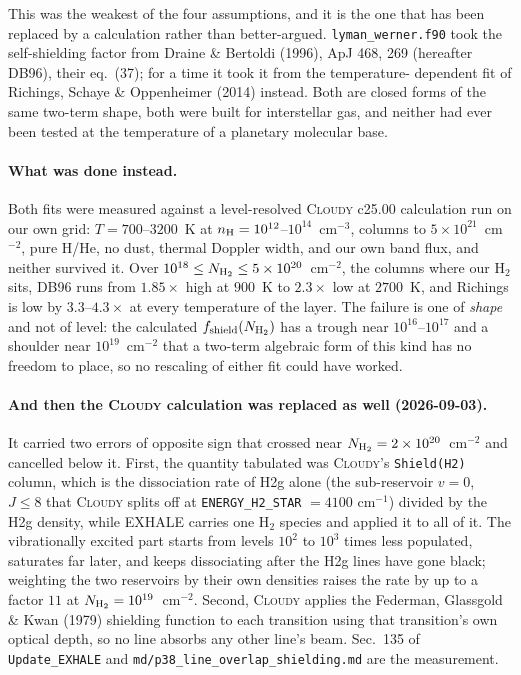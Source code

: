 \documentclass[english,a4paper]{my_memo}
\begin{document}
This was the weakest of the four assumptions, and it is the one that has been
replaced by a calculation rather than better-argued. \texttt{lyman\_werner.f90}
took the self-shielding factor from Draine \& Bertoldi (1996), ApJ 468, 269
(hereafter DB96), their eq.~(37); for a time it took it from the temperature-%
dependent fit of Richings, Schaye \& Oppenheimer (2014) instead. Both are
closed forms of the same two-term shape, both were built for interstellar gas,
and neither had ever been tested at the temperature of a planetary molecular
base.

\paragraph{What was done instead.} Both fits were measured against a
level-resolved \textsc{Cloudy} c25.00 calculation run on our own grid:
$T = 700$--$3200$~K at $n_{\rm H} = 10^{12}$--$10^{14}$~cm$^{-3}$, columns to
$5\times10^{21}$~cm$^{-2}$, pure H/He, no dust, thermal Doppler width, and our
own band flux, and neither survived it. Over $10^{18} \le N_{\rm H_2} \le
5\times10^{20}$~cm$^{-2}$, the columns where our H$_2$ sits, DB96 runs from
$1.85\times$ high at $900$~K to $2.3\times$ low at $2700$~K, and Richings is
low by $3.3$--$4.3\times$ at every temperature of the layer. The failure is
one of \emph{shape} and not of level: the calculated
$f_{\rm shield}(N_{\rm H_2})$ has a trough near $10^{16}$--$10^{17}$ and a
shoulder near $10^{19}$~cm$^{-2}$ that a two-term algebraic form of this kind
has no freedom to place, so no rescaling of either fit could have worked.

\paragraph{And then the \textsc{Cloudy} calculation was replaced as well
(2026-09-03).} It carried two errors of opposite sign that crossed near
$N_{\rm H_2} = 2\times10^{20}$~cm$^{-2}$ and cancelled below it. First, the
quantity tabulated was \textsc{Cloudy}'s \texttt{Shield(H2)} column, which is
the dissociation rate of H2g alone (the sub-reservoir $v = 0$, $J \le 8$
that \textsc{Cloudy} splits off at \texttt{ENERGY\_H2\_STAR} $= 4100$
cm$^{-1}$) divided by the H2g density, while EXHALE carries one H$_2$
species and applied it to all of it. The vibrationally excited part starts
from levels $10^{2}$ to $10^{3}$ times less populated, saturates far later,
and keeps dissociating after the H2g lines have gone black; weighting the two
reservoirs by their own densities raises the rate by up to a factor $11$ at
$N_{\rm H_2} = 10^{19}$~cm$^{-2}$. Second, \textsc{Cloudy} applies the
Federman, Glassgold \& Kwan (1979) shielding function to each transition using
that transition's own optical depth, so no line absorbs any other line's beam.
Sec.~135 of \texttt{Update\_EXHALE} and
\texttt{md/p38\_line\_overlap\_shielding.md} are the measurement.
\end{document}
